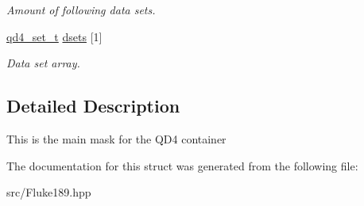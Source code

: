 \begin{DoxyCompactItemize}
\begin{DoxyCompactList}\small\item\em Amount of following data sets. \item\end{DoxyCompactList}\item 
\hypertarget{structFluke_1_1Fluke189_1_1cmdr__QD4__t_a52046440888a475d2872ed934bdf9bdd}{
\hyperlink{structFluke_1_1Fluke189_1_1qd4__set__t}{qd4\_\-set\_\-t} \hyperlink{structFluke_1_1Fluke189_1_1cmdr__QD4__t_a52046440888a475d2872ed934bdf9bdd}{dsets} \mbox{[}1\mbox{]}}
\label{structFluke_1_1Fluke189_1_1cmdr__QD4__t_a52046440888a475d2872ed934bdf9bdd}

\begin{DoxyCompactList}\small\item\em Data set array. \item\end{DoxyCompactList}\end{DoxyCompactItemize}


\subsection{Detailed Description}
This is the main mask for the QD4 container 

The documentation for this struct was generated from the following file:\begin{DoxyCompactItemize}
\item 
src/Fluke189.hpp\end{DoxyCompactItemize}
